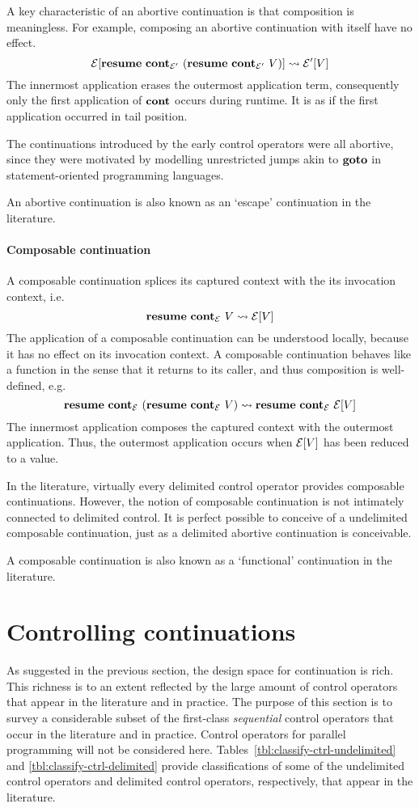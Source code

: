 \documentclass[12pt,phd,lfcs,twoside,openright,logo,leftchapter,normalheadings]{infthesis}
\theoremstyle{plain}
\theoremstyle{definition}
\begin{document}
A key characteristic of an abortive continuation is that composition
is meaningless. For example, composing an abortive continuation with
itself have no effect.
%
\[
  \mathcal{E}[\mathbf{resume}~\mathbf{cont}_{\mathcal{E}'}~(\mathbf{resume}~\mathbf{cont}_{\mathcal{E}'}~V)] \leadsto \mathcal{E}'[V]
\]
%
The innermost application erases the outermost application term,
consequently only the first application of $\mathbf{cont}$ occurs during
runtime. It is as if the first application occurred in tail position.

The continuations introduced by the early control operators were all
abortive, since they were motivated by modelling unrestricted jumps
akin to $\mathbf{goto}$ in statement-oriented programming languages.

An abortive continuation is also known as an `escape' continuation in
the literature.

\paragraph{Composable continuation} A composable continuation splices
its captured context with the its invocation context, i.e.
%
\[
  \mathbf{resume}~\mathbf{cont}_{\mathcal{E}}~V \leadsto \mathcal{E}[V]
\]
%
The application of a composable continuation can be understood
locally, because it has no effect on its invocation context. A
composable continuation behaves like a function in the sense that it
returns to its caller, and thus composition is well-defined, e.g.
%
\[
  \mathbf{resume}~\mathbf{cont}_{\mathcal{E}}~(\mathbf{resume}~\mathbf{cont}_{\mathcal{E}}~V) \leadsto \mathbf{resume}~\mathbf{cont}_{\mathcal{E}}~\mathcal{E}[V]
\]
%
The innermost application composes the captured context with the
outermost application. Thus, the outermost application occurs when
$\mathcal{E}[V]$ has been reduced to a value.

In the literature, virtually every delimited control operator provides
composable continuations. However, the notion of composable
continuation is not intimately connected to delimited control. It is
perfect possible to conceive of a undelimited composable continuation,
just as a delimited abortive continuation is conceivable.

A composable continuation is also known as a `functional' continuation
in the literature.

\section{Controlling continuations}
\label{sec:controlling-continuations}
As suggested in the previous section, the design space for
continuation is rich. This richness is to an extent reflected by the
large amount of control operators that appear in the literature
and in practice.
%
The purpose of this section is to survey a considerable subset of the
first-class \emph{sequential} control operators that occur in the
literature and in practice. Control operators for parallel programming
will not be considered here.
%
Tables~\ref{tbl:classify-ctrl-undelimited} and
\ref{tbl:classify-ctrl-delimited} provide classifications of some of
the undelimited control operators and delimited control operators,
respectively, that appear in the literature.
\end{document}
